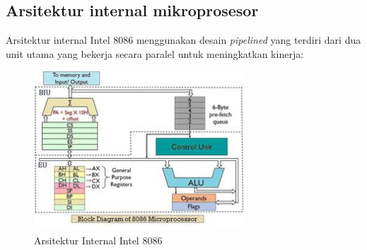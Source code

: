 \documentclass[../main.tex]{subfiles}
\begin{document}
\subsection{Arsitektur internal mikroprosesor}
Arsitektur internal Intel 8086 menggunakan desain \textit{pipelined} yang terdiri dari dua unit utama yang bekerja secara paralel untuk meningkatkan kinerja:

\begin{figure}[h]
  \centering
  \includegraphics[width=0.7\textwidth]{../images/8086_architecture.jpg}
  \caption{Arsitektur Internal Intel 8086}
  \label{fig:8086-architecture}
  \end{figure}
\end{document}
